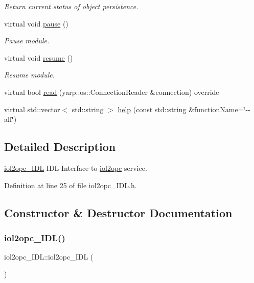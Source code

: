 \begin{DoxyCompactItemize}
\begin{DoxyCompactList}\small\item\em Return current status of object persistence. \end{DoxyCompactList}\item 
virtual void \hyperlink{classiol2opc__IDL_a98bd49ef49a7600dc2d995dc165e73ce}{pause} ()
\begin{DoxyCompactList}\small\item\em Pause module. \end{DoxyCompactList}\item 
virtual void \hyperlink{classiol2opc__IDL_a10ec403a9dfc09503e3155227c7283bb}{resume} ()
\begin{DoxyCompactList}\small\item\em Resume module. \end{DoxyCompactList}\item 
virtual bool \hyperlink{classiol2opc__IDL_a6604c8b35853929ba57ee643a8bf9894}{read} (yarp\+::os\+::\+Connection\+Reader \&connection) override
\item 
virtual std\+::vector$<$ std\+::string $>$ \hyperlink{classiol2opc__IDL_ab4c595b6f7371a052624190440bf6d05}{help} (const std\+::string \&function\+Name=\char`\"{}-\/-\/all\char`\"{})
\end{DoxyCompactItemize}


\subsection{Detailed Description}
\hyperlink{classiol2opc__IDL}{iol2opc\+\_\+\+I\+DL} I\+DL Interface to \hyperlink{group__iol2opc}{iol2opc} service. 

Definition at line 25 of file iol2opc\+\_\+\+I\+D\+L.\+h.



\subsection{Constructor \& Destructor Documentation}
\mbox{\label{classiol2opc__IDL_ac05579cbbff611ecb48b422b1dc3c8bb}} 
\subsubsection{\texorpdfstring{iol2opc\+\_\+\+I\+D\+L()}{iol2opc\_IDL()}}
{\footnotesize\ttfamily iol2opc\+\_\+\+I\+D\+L\+::iol2opc\+\_\+\+I\+DL (\begin{DoxyParamCaption}{ }\end{DoxyParamCaption})}



